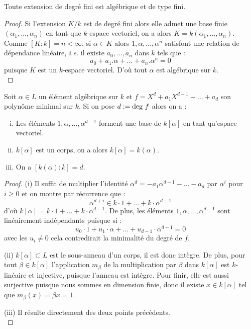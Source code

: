 \documentclass[a4paper]{article} %
\numberwithin{section}{part}
\numberwithin{equation}{section}
\begin{document}
\begin{prop}
Toute extension de degré fini est algébrique et de type fini.
\end{prop}
\begin{proof}
Si l'extension $K/k$ est de degré fini alors elle admet une base finie 
$(\alpha_1,\dots,\alpha_n)$ en tant que $k$-espace vectoriel, on a alors $K 
= k(\alpha_1,\dots,\alpha_n)$. Comme $[K:k] = n < \infty$, si $\alpha\in K$ 
alors $1, \alpha, \dots, \alpha^n$ satisfont une relation de dépendance 
linéaire, \textit{i.e.} il existe $a_0, \dots, a_n$ dans $k$ tels que :
\[a_0 + a_1.\alpha + \dots + a_n.\alpha^n = 0\]
puisque $K$ est un $k$-espace vectoriel. D'où tout $\alpha$ est algébrique 
sur $k$.\\
\end{proof}

\begin{prop}
Soit $\alpha\in L$ un élément algébrique sur $k$ et $f = X^d + a_1X^{d-1} + 
\dots + a_d$ son polynôme minimal sur $k$. Si on pose $d := \textup{deg }f$ 
alors on a :
\begin{enumerate}[(i)]
\item Les éléments $1, \alpha,\dots,\alpha^{d-1}$ forment une base de 
$k[\alpha]$ en tant qu'espace vectoriel.
\item $k[\alpha]$ est un corps, on a alors $k[\alpha] = k(\alpha)$.
\item On a $[k(\alpha):k] = d$.
\end{enumerate}
\end{prop}

\begin{proof}
(i) Il suffit de multiplier l'identité $\alpha^d = -a_1\alpha^{d-1} - \dots 
- a_d$ par $\alpha^i$ pour $i\geq0$ et on montre par récurrence que :
\[\alpha^{d+i} \in k\cdot1 + \dots + k\cdot\alpha^{d-1}\]
d'où $k[\alpha] = k\cdot1 + \dots + k\cdot\alpha^{d-1}$. De plus, les éléments 
$1,\alpha,\dots,\alpha^{d-1}$ sont linéairement indépendants puisque si :
\[u_0\cdot1 + u_1\cdot\alpha + \dots + u_{d-1}\cdot\alpha^{d-1} = 0\]
avec les $u_i\neq0$ cela contredirait la minimalité du degré de $f$.\par
(ii) $k[\alpha] \subset L$ est le sous-anneau d'un corps, il est donc intègre. 
De plus, pour tout $\beta\in k[\alpha]$ l'application $m_{\beta}$ de la 
multiplication par $\beta$ dans $k[\alpha]$ est $k$-linéaire et injective, 
puisque l'anneau est intègre. Pour finir, elle est aussi surjective puisque 
nous sommes en dimension finie, donc il existe $x\in k[\alpha]$ tel que 
$m_{\beta}(x) = \beta x = 1$.\par
(iii) Il résulte directement des deux points précédents.\\
\end{proof}
\end{document}
